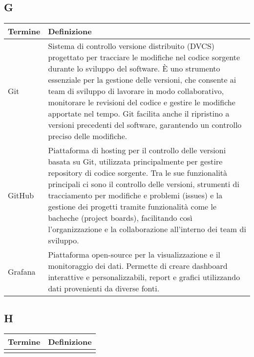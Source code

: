\documentclass[10pt]{article}
\begin{document}
\subsection{G} %
\begin{longtable}{|>{\centering\arraybackslash}m{2.5cm}|>{\arraybackslash}m{12.5cm}|}
\hline
\rowcolor[gray]{0.8}
\textbf{Termine} & \textbf{Definizione}\\
\endhead
\hline
Git & Sistema di controllo versione distribuito (DVCS) progettato per tracciare le modifiche nel codice sorgente durante lo sviluppo del software. È uno strumento essenziale per la gestione delle versioni, che consente ai team di sviluppo di lavorare in modo collaborativo, monitorare le revisioni del codice e gestire le modifiche apportate nel tempo. Git facilita anche il ripristino a versioni precedenti del software, garantendo un controllo preciso delle modifiche.\\
\hline
GitHub & Piattaforma di hosting per il controllo delle versioni basata su Git, utilizzata principalmente per gestire repository di codice sorgente. Tra le sue funzionalità principali ci sono il controllo delle versioni, strumenti di tracciamento per modifiche e problemi (issues) e la gestione dei progetti tramite funzionalità come le bacheche (project boards), facilitando così l’organizzazione e la collaborazione all’interno dei team di sviluppo.\\
\hline
Grafana & Piattaforma open-source per la visualizzazione e il monitoraggio dei dati. Permette di creare dashboard interattive e personalizzabili, report e grafici utilizzando dati provenienti da diverse fonti.\\
\hline
\end{longtable}

\subsection{H} %
\begin{longtable}{|>{\centering\arraybackslash}m{2.5cm}|>{\arraybackslash}m{12.5cm}|}
\hline
\rowcolor[gray]{0.8}
\textbf{Termine} & \textbf{Definizione}\\
\endhead
\hline
 & \\
\hline
\end{longtable}
\end{document}
